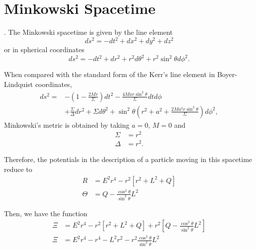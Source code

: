 
\section{Minkowski Spacetime}.
The Minkowski spacetime is given by the line element
\begin{equation}
	ds^2 = -dt^2 + dx^2 + dy^2 + dz^2
\end{equation}
or in spherical coordinates
\begin{equation}
 	ds^2 = -dt^2 + dr^2 + r^2 d\theta^2 + r^2 \sin^2 \theta d\phi^2.
\end{equation} 

When compared with the standard form of the Kerr's line element in Boyer-Lindquist coordinates,
\begin{align}
	ds^2 = &-\left( 1- \frac{2Mr}{\Sigma} \right) dt^2 -\frac{4Mar\sin^2 \theta}{\Sigma} dt d\phi \nonumber  \\
	&+ \frac{\Sigma}{\Delta} dr^2 +\Sigma d\theta^2 + \sin^2 \theta \left( r^2 + a^2 +\frac{2Ma^2 r \sin^2 \theta}{\Sigma} \right) d\phi^2,
\end{align}
Minkowski's metric is obtained by taking $a=0$, $M=0$ and
\begin{align}
	\Sigma &= r^2\\
	\Delta &= r^2.
\end{align}

Therefore, the potentials in the description of a particle moving in this spacetime reduce to
\begin{align}
	R &= E^2 r^4 - r^2 \left[ r^2 + L^2 + Q \right] \\
	\Theta &= Q -  \frac{\cos^2 \theta}{\sin^2 \theta}L^2
\end{align}

Then, we have the function
\begin{align}
	\Xi &= E^2 r^4 - r^2 \left[ r^2 + L^2 + Q \right] + r^2 \left[ Q -  \frac{\cos^2 \theta}{\sin^2 \theta}L^2 \right] \nonumber \\
	\Xi &= E^2 r^4 -  r^4 -  L^2 r^2  - r^2 \frac{\cos^2 \theta}{\sin^2 \theta}L^2 
\end{align}

